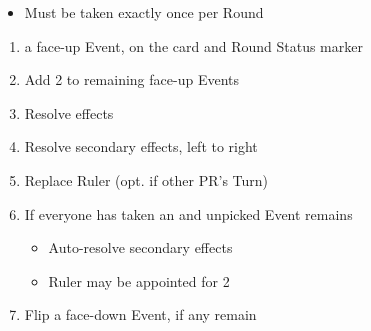 \documentclass[10pt]{article}
\begin{document}
\addbackground
\addfooter


\begin{itemize}
	\item Must be taken exactly once per Round
\end{itemize}
\begin{enumerate}
	\item {} a face-up Event,  \ducats on the card and  Round Status marker	\item Add 2 \ducats to remaining face-up Events
	\item Resolve effects
	\item {}Resolve secondary effects, left to right
	\item Replace Ruler (opt. if other PR's Turn)
	\item If everyone has taken an  and unpicked Event remains
	\begin{itemize}
		\item Auto-resolve secondary effects
		\item Ruler may be appointed for 2\adminpower
	\end{itemize}
	\item Flip a face-down Event, if any remain
\end{enumerate}
\end{document}
